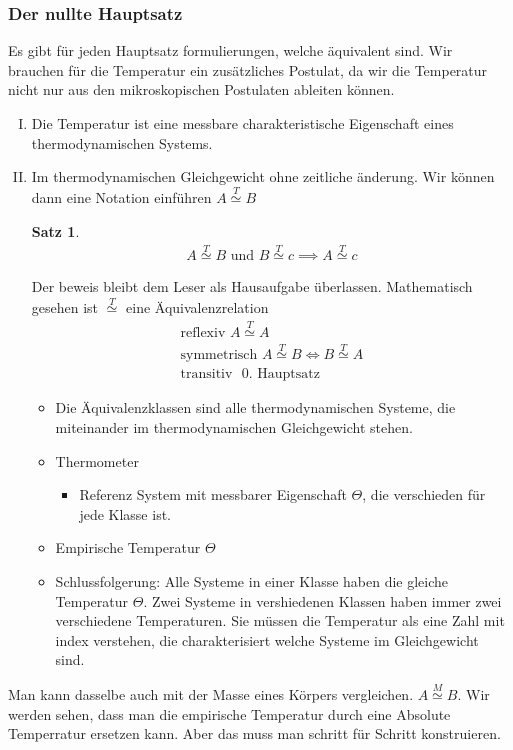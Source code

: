 \documentclass[11pt]{article}
\theoremstyle{plain}
\newtheorem*{satz}{Satz}
\theoremstyle{mytheoremstyle}
\begin{document}
\subsubsection*{Der nullte Hauptsatz}
Es gibt f\"ur jeden Hauptsatz formulierungen, welche \"aquivalent sind.
 Wir brauchen f\"ur die Temperatur ein zus\"atzliches
Postulat, da wir die Temperatur nicht nur aus den mikroskopischen Postulaten ableiten k\"onnen.
\begin{enumerate}[I)]
  \item Die Temperatur ist eine messbare charakteristische Eigenschaft
    eines thermodynamischen Systems.
  \item Im thermodynamischen Gleichgewicht ohne zeitliche \"anderung.
    Wir k\"onnen dann eine Notation einf\"uhren 
    $A \overset{T}{\simeq} B$

    \begin{satz}
      \begin{align*}
        A \overset{T}{\simeq} B \text{ und } B \overset{T}{\simeq} c \implies
        A \overset{T}{\simeq} c
      \end{align*}
    \end{satz}
    Der beweis bleibt dem Leser als Hausaufgabe \"uberlassen.
    Mathematisch gesehen ist $\overset{T}{\simeq}$ eine \"Aquivalenzrelation
    \begin{align*}
      \text{reflexiv } A \overset{T}{\simeq} A \\
      \text{symmetrisch } A \overset{T}{\simeq} B \iff B \overset{T}{\simeq} A\\
      \text{transitiv } \text{ 0. Hauptsatz}
    \end{align*}
    \begin{itemize}
      \item Die \"Aquivalenzklassen sind alle thermodynamischen Systeme,
        die miteinander im thermodynamischen Gleichgewicht stehen.

      \item Thermometer
        \begin{itemize}
          \item Referenz System mit messbarer Eigenschaft $\Theta$,
            die verschieden f\"ur jede Klasse ist.
        \end{itemize}
      \item Empirische Temperatur $\Theta$
      \item Schlussfolgerung: Alle Systeme in einer Klasse haben die 
        gleiche Temperatur $\Theta$. Zwei Systeme in vershiedenen Klassen
        haben immer zwei verschiedene Temperaturen. Sie m\"ussen die 
        Temperatur als eine Zahl mit index verstehen, die charakterisiert
        welche Systeme im Gleichgewicht sind.
    \end{itemize}
\end{enumerate} 
Man kann dasselbe auch mit der Masse eines K\"orpers vergleichen.
$A \overset{M}{\simeq} B$.  Wir werden sehen, dass man die empirische Temperatur durch
eine Absolute Temperratur ersetzen kann. Aber das muss man schritt f\"ur
Schritt konstruieren.
\end{document}
